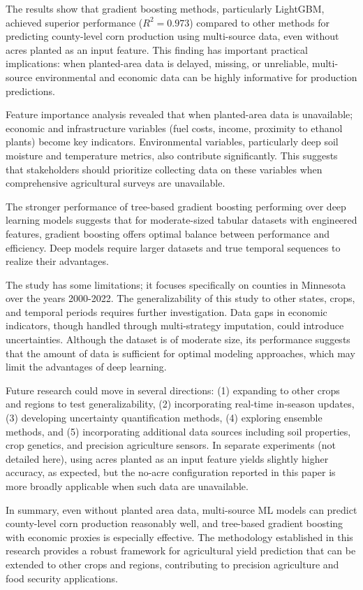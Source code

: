 \documentclass[twocolumn]{article}
\begin{document}
The results show that gradient boosting methods, particularly LightGBM, achieved superior performance ($R^2 = 0.973$) compared to other methods for predicting county-level corn production using multi-source data, even without acres planted as an input feature. This finding has important practical implications: when planted-area data is delayed, missing, or unreliable, multi-source environmental and economic data can be highly informative for production predictions.

Feature importance analysis revealed that when planted-area data is unavailable; economic and infrastructure variables (fuel costs, income, proximity to ethanol plants) become key indicators. Environmental variables, particularly deep soil moisture and temperature metrics, also contribute significantly. This suggests that stakeholders should prioritize collecting data on these variables when comprehensive agricultural surveys are unavailable.

The stronger performance of tree-based gradient boosting performing over deep learning models suggests that for moderate-sized tabular datasets with engineered features, gradient boosting offers optimal balance between performance and efficiency. Deep models require larger datasets and true temporal sequences to realize their advantages.

The study has some limitations; it focuses specifically on counties in Minnesota over the years 2000-2022. The generalizability of this study to other states, crops, and temporal periods requires further investigation. Data gaps in economic indicators, though handled through multi-strategy imputation, could introduce uncertainties. Although the dataset is of moderate size, its performance suggests that the amount of data is sufficient for optimal modeling approaches, which may limit the advantages of deep learning.

Future research could move in several directions: (1) expanding to other crops and regions to test generalizability, (2) incorporating real-time in-season updates, (3) developing uncertainty quantification methods, (4) exploring ensemble methods, and (5) incorporating additional data sources including soil properties, crop genetics, and precision agriculture sensors. In separate experiments (not detailed here), using acres planted as an input feature yields slightly higher accuracy, as expected, but the no-acre configuration reported in this paper is more broadly applicable when such data are unavailable.

In summary, even without planted area data, multi-source ML models can predict county-level corn production reasonably well, and tree-based gradient boosting with economic proxies is especially effective. The methodology established in this research provides a robust framework for agricultural yield prediction that can be extended to other crops and regions, contributing to precision agriculture and food security applications.
\end{document}
